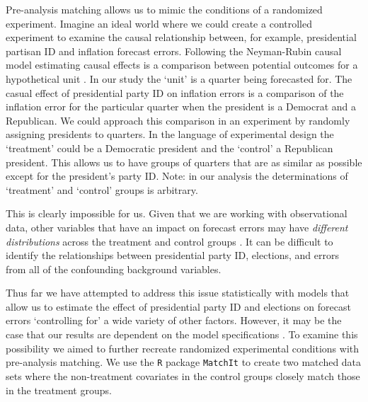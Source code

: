 \documentclass[a4paper]{article}\usepackage[]{graphicx}\usepackage[]{color}
\begin{document}
Pre-analysis matching allows us to mimic the conditions of a randomized experiment. Imagine an ideal world where we could create a controlled experiment to examine the causal relationship between, for example, presidential partisan ID and inflation forecast errors. Following the Neyman-Rubin causal model \citep{Sekhon2008} estimating causal effects is a comparison between potential outcomes for a hypothetical unit \citep{Stuart2010}. In our study the `unit' is a quarter being forecasted for. The casual effect of presidential party ID on inflation errors is a comparison of the inflation error for the particular quarter when the president is a Democrat and a Republican. We could approach this comparison in an experiment by randomly assigning presidents to quarters. In the language of experimental design the `treatment' could be a Democratic president and the `control' a Republican president. This allows us to have groups of quarters that are as similar as possible except for the president's party ID. Note: in our analysis the determinations of `treatment' and `control' groups is arbitrary.

This is clearly impossible for us. Given that we are working with observational data, other variables that have an impact on forecast errors may have {\emph{different distributions}} across the treatment and control groups \citep{Cochran1973, Diamond2012}. It can be difficult to identify the relationships between presidential party ID, elections, and errors from all of the confounding background variables.

Thus far we have attempted to address this issue statistically with models that allow us to estimate the effect of presidential party ID and elections on forecast errors `controlling for' a wide variety of other factors. However, it may be the case that our results are dependent on the model specifications \citep{Ho2007}. To examine this possibility we aimed to further recreate randomized experimental conditions with pre-analysis matching. We use the {\tt{R}} package {\tt{MatchIt}} \citep{matchit2011} to create two matched data sets where the non-treatment covariates in the control groups closely match those in the treatment groups.
\end{document}
